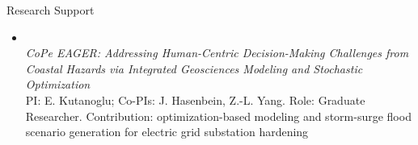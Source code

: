 \begin{rSection}{Research Support}
\begin{itemize}
    \item {}\\
    \textit{CoPe EAGER: Addressing Human-Centric Decision-Making Challenges from Coastal Hazards via Integrated Geosciences Modeling and Stochastic Optimization}\\
    {\small PI: E. Kutanoglu; Co-PIs: J. Hasenbein, Z.-L. Yang. Role: Graduate Researcher. Contribution: optimization-based modeling and storm-surge flood scenario generation for electric grid substation hardening}
\end{itemize}
\end{rSection}
